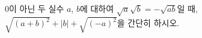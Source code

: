 $0$이 아닌 두 실수 $a$, $b$에 대하여 $\sqrt{a}\sqrt{b}=-\sqrt{ab}$일 때, $\sqrt{(a+b)^2}+|b|+\sqrt{(-a)^2}$을 간단히 하시오.
